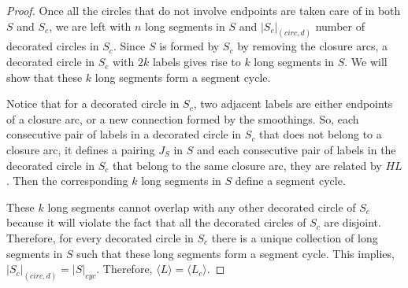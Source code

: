 \documentclass{article}
\begin{document}
\begin{proof}


Once all the circles that do not involve endpoints are taken care of in both $S$ and $S_c$, we are left with $n$ long segments in $S$ and $|S_c|_{(circ,d)}$ number of decorated circles in $S_c$. 
Since $S$ is formed by $S_c$ by removing the closure arcs, a decorated circle in $S_c$ with $2k$ labels gives rise to $k$ long segments in $S$. 
We will show that these $k$ long segments form a segment cycle. 

Notice that for a decorated circle in $S_c$, two adjacent labels are either endpoints of a closure arc, or a new connection formed by the smoothings. So, each consecutive pair of labels in a decorated circle in $S_c$ that does not belong to a closure arc, it defines a pairing $J_S$ in $S$ and each consecutive pair of labels in the decorated circle in $S_c$ that belong to the same closure arc, they are related by $HL$. Then the corresponding $k$ long segments in $S$ define a segment cycle. %

These $k$ long segments cannot overlap with any other decorated circle of $S_c$ because it will violate the fact that all the decorated circles of $S_c$ are disjoint. Therefore, for every decorated circle in $S_c$ there is a unique collection of long segments in $S$ such that these long segments form a segment cycle. This implies, $|S_c|_{(circ,d)} = |S|_{cyc}$. Therefore, $\langle L \rangle = \langle L_c \rangle$.  
\end{proof}
\end{document}
